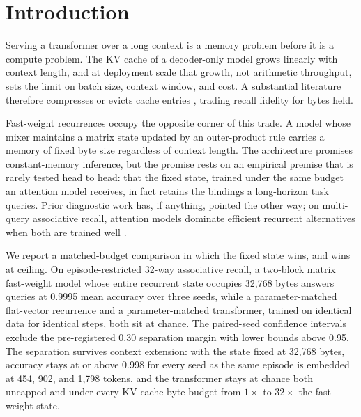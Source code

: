 \section{Introduction}

Serving a transformer over a long context is a memory problem before it is a
compute problem. The KV cache of a decoder-only model
\citep{vaswani2017attention} grows linearly with context length, and at
deployment scale that growth, not arithmetic throughput, sets the limit on
batch size, context window, and cost. A substantial literature therefore
compresses or evicts cache entries \citep{xiao2023efficient, zhang2023h2o},
trading recall fidelity for bytes held.

Fast-weight recurrences occupy the opposite corner of this trade. A model
whose mixer maintains a matrix state updated by an outer-product rule
\citep{schmidhuber1992learning, ba2016using, schlag2021linear,
katharopoulos2020transformers, yang2024parallelizing, gu2023mamba} carries a
memory of fixed byte size regardless of context length. The architecture
promises constant-memory inference, but the promise rests on an empirical
premise that is rarely tested head to head: that the fixed state, trained
under the same budget an attention model receives, in fact retains the
bindings a long-horizon task queries. Prior diagnostic work has, if
anything, pointed the other way; on multi-query associative recall,
attention models dominate efficient recurrent alternatives when both are
trained well \citep{arora2023zoology}.

We report a matched-budget comparison in which the fixed state wins, and
wins at ceiling. On episode-restricted 32-way associative recall, a
two-block matrix fast-weight model whose entire recurrent state occupies
32{,}768 bytes %
answers queries at 0.9995 mean accuracy over three seeds, %
while a parameter-matched flat-vector recurrence and a parameter-matched
transformer, trained on identical data for identical steps, both sit at
chance. %
The paired-seed confidence intervals exclude the pre-registered 0.30
separation margin with lower bounds above 0.95. %
The separation survives context extension: with the state fixed at
32{,}768 bytes, accuracy stays at or above 0.998 for every seed as the same
episode is embedded at 454, 902, and 1{,}798 tokens, %
and the transformer stays at chance both uncapped and under every KV-cache
byte budget from $1\times$ to $32\times$ the fast-weight state. %

